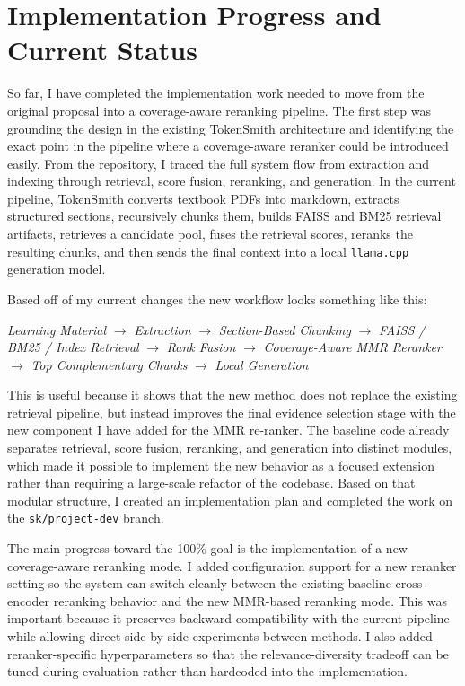 \documentclass[sigconf]{acmart}
\begin{document}
\section{Implementation Progress and Current Status}
So far, I have completed the implementation work needed to move from the original proposal into a coverage-aware reranking pipeline. The first step was grounding the design in the existing TokenSmith architecture and identifying the exact point in the pipeline where a coverage-aware reranker could be introduced easily. From the repository, I traced the full system flow from extraction and indexing through retrieval, score fusion, reranking, and generation. In the current pipeline, TokenSmith converts textbook PDFs into markdown, extracts structured sections, recursively chunks them, builds FAISS and BM25 retrieval artifacts, retrieves a candidate pool, fuses the retrieval scores, reranks the resulting chunks, and then sends the final context into a local \texttt{llama.cpp} generation model.

Based off of my current changes the new workflow looks something like this:

\begin{center}
\textit{Learning Material} $\rightarrow$ \textit{Extraction} $\rightarrow$ \textit{Section-Based Chunking} $\rightarrow$ \textit{FAISS / BM25 / Index Retrieval} $\rightarrow$ \textit{Rank Fusion} $\rightarrow$ \textit{Coverage-Aware MMR Reranker} $\rightarrow$ \textit{Top Complementary Chunks} $\rightarrow$ \textit{Local Generation}
\end{center}

This is useful because it shows that the new method does not replace the existing retrieval pipeline, but instead improves the final evidence selection stage with the new component I have added for the MMR re-ranker. The baseline code already separates retrieval, score fusion, reranking, and generation into distinct modules, which made it possible to implement the new behavior as a focused extension rather than requiring a large-scale refactor of the codebase. Based on that modular structure, I created an implementation plan and completed the work on the \texttt{sk/project-dev} branch.

The main progress toward the 100\% goal is the implementation of a new coverage-aware reranking mode. I added configuration support for a new reranker setting so the system can switch cleanly between the existing baseline cross-encoder reranking behavior and the new MMR-based reranking mode. This was important because it preserves backward compatibility with the current pipeline while allowing direct side-by-side experiments between methods. I also added reranker-specific hyperparameters so that the relevance-diversity tradeoff can be tuned during evaluation rather than hardcoded into the implementation.
\end{document}
